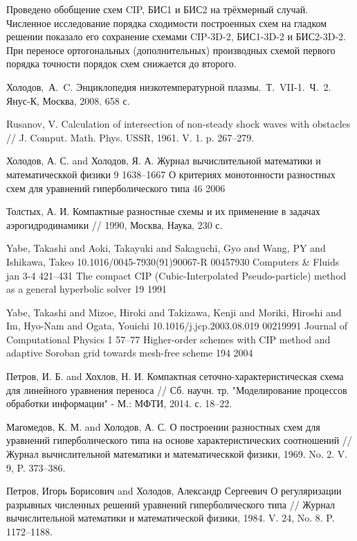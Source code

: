 \documentclass[11pt]{article}
\begin{document}
Проведено обобщение схем CIP, БИС1 и БИС2 на трёхмерный случай.
Численное исследование порядка сходимости построенных схем на гладком решении показало его сохранение схемами
CIP-3D-2, БИС1-3D-2 и БИС2-3D-2.
При переносе ортогональных (дополнительных) производных схемой первого порядка точности порядок схем снижается до второго.

\begin{thebibliography}{99}

Холодов,~А.~C. Энциклопедия низкотемпературной плазмы.~Т.~VII-1.~Ч.~2. Янус-К, Москва, 2008. 658 с.

Rusanov, V. Calculation of intersection of non-steady shock waves with obstacles // J. Comput. Math. Phys. USSR, 1961. V. 1. p. 267--279.

Холодов, А. С. and Холодов, Я. А. Журнал вычислительной математики и математическкой физики 9 1638--1667 О критериях монотонности разностных схем для уравнений гиперболического типа 46 2006

Толстых, А. И. Компактные разностные схемы и их применение в задачах аэрогидродинамики // 1990, Москва, Наука, 230 с.

Yabe, Takashi and Aoki, Takayuki and Sakaguchi, Gyo and Wang, PY and Ishikawa, Takeo 10.1016/0045-7930(91)90067-R 00457930 Computers \& Fluids jan 3-4 421--431 The compact CIP (Cubic-Interpolated Pseudo-particle) method as a general hyperbolic solver 19 1991

Yabe, Takashi and Mizoe, Hiroki and Takizawa, Kenji and Moriki, Hiroshi and Im, Hyo-Nam and Ogata, Youichi 10.1016/j.jcp.2003.08.019 00219991 Journal of Computational Physics 1 57--77 Higher-order schemes with CIP method and adaptive Soroban grid towards mesh-free scheme 194 2004

Петров, И. Б. and Хохлов, Н. И. Компактная сеточно-характеристическая схема для линейного уравнения переноса // Сб. научн. тр. "Моделирование процессов обработки информации" - М.: МФТИ,
2014. с. 18--22.

Магомедов, К. М. and Холодов, А. С. О построении разностных схем для уравнений гиперболического типа на основе характеристических соотношений // Журнал вычислительной математики и математическкой физики, 1969. No. 2. V. 9, P. 373--386.

Петров, Игорь Борисович and Холодов, Александр Сергеевич О регуляризации разрывных численных решений уравнений гиперболического типа // Журнал вычислительной математики и математической физики, 1984. V. 24, No. 8. P. 1172--1188.


\end{thebibliography}
\end{document}
